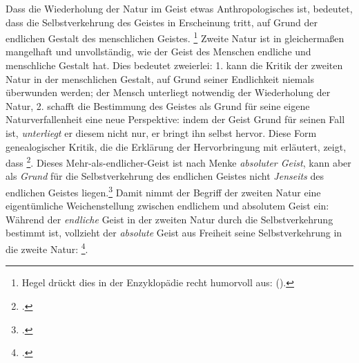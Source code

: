 \documentclass[12pt, a4paper, openany]{report}
\begin{document}
Dass die Wiederholung der Natur im Geist etwas Anthropologisches ist, bedeutet, dass die Selbstverkehrung des Geistes in Erscheinung tritt, auf Grund der endlichen Gestalt des menschlichen Geistes.%
\footnote{
    Hegel drückt dies in der Enzyklopädie recht humorvoll aus:  (\cite[][§ 410 (Anmerkung), S. 186]{hegel_enzyklopädie_1969}).
}
Zweite Natur ist in gleichermaßen mangelhaft und unvollständig, wie der Geist des Menschen endliche und menschliche Gestalt hat.
Dies bedeutet zweierlei: 
1. kann die Kritik der zweiten Natur in der menschlichen Gestalt, auf Grund seiner Endlichkeit niemals überwunden werden;
der Mensch unterliegt notwendig der Wiederholung der Natur,
2. schafft die Bestimmung des Geistes als Grund für seine eigene Naturverfallenheit eine neue Perspektive: 
indem der Geist Grund für seinen Fall ist, \emph{unterliegt} er diesem nicht nur, er bringt ihn selbst hervor.
Diese Form genealogischer Kritik, die die Erklärung der Hervorbringung mit erläutert, zeigt, dass \footcite[][140]{menke_autonomie_2018}.
Dieses Mehr-als-endlicher-Geist ist nach Menke \emph{absoluter Geist}, kann aber als \emph{Grund} für die Selbstverkehrung des endlichen Geistes nicht \emph{Jenseits} des endlichen Geistes liegen.\footcite[Vgl.][140]{menke_autonomie_2018}
Damit nimmt der Begriff der zweiten Natur eine eigentümliche Weichenstellung zwischen endlichem und absolutem Geist ein:
Während der \emph{endliche} Geist in der zweiten Natur durch die Selbstverkehrung bestimmt ist, vollzieht der \emph{absolute} Geist aus Freiheit seine Selbstverkehrung in die zweite Natur:
\footcite[Vgl.][140]{menke_autonomie_2018}.
\end{document}
